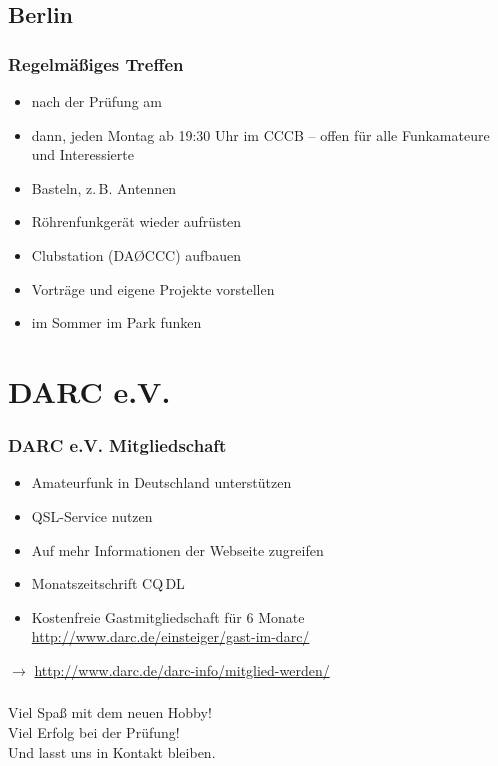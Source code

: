 \subsection{Berlin}
\begin{frame}
  \frametitle{Regelmäßiges Treffen}
  \begin{itemize}
    \item {} nach der Prüfung am 
    \item dann, jeden Montag ab 19:30 Uhr im CCCB -- offen für alle Funkamateure und Interessierte
    \item Basteln, z.\,B. Antennen
    \item Röhrenfunkgerät wieder aufrüsten
    \item Clubstation (DAØCCC) aufbauen
    \item Vorträge und eigene Projekte vorstellen
    \item im Sommer im Park funken
  \end{itemize}
\end{frame}

\section{DARC e.V.}
\begin{frame}
  \frametitle{DARC e.V. Mitgliedschaft}
  \begin{itemize}
    \item Amateurfunk in Deutschland unterstützen
    \item QSL-Service nutzen
    \item Auf mehr Informationen der Webseite zugreifen
    \item Monatszeitschrift CQ\,DL
    \item Kostenfreie Gastmitgliedschaft für 6 Monate \url{http://www.darc.de/einsteiger/gast-im-darc/}
  \end{itemize}
  \vspace{1.5em}
  $\rightarrow$ \url{http://www.darc.de/darc-info/mitglied-werden/}
\end{frame}

\begin{frame}
  \frametitle{\checkmark}
  \begin{center}
    {\Huge Viel Spaß mit dem neuen Hobby!}\\[.5em]
    {\Huge Viel Erfolg bei der Prüfung!}\\[.5em]
    Und lasst uns in Kontakt bleiben.
  \end{center}
\end{frame}


